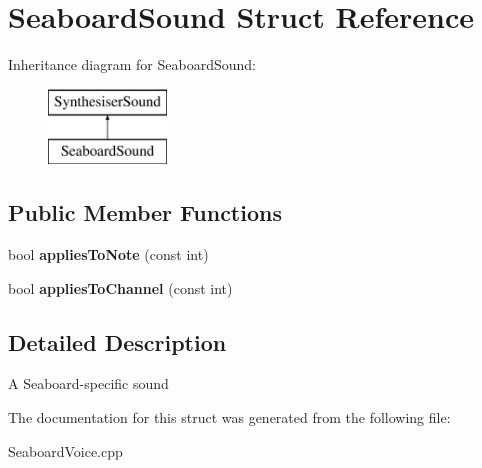 \hypertarget{struct_seaboard_sound}{\section{Seaboard\-Sound Struct Reference}
\label{struct_seaboard_sound}
}
Inheritance diagram for Seaboard\-Sound\-:\begin{figure}[H]
\begin{center}
\leavevmode
\includegraphics[height=2.000000cm]{struct_seaboard_sound}
\end{center}
\end{figure}
\subsection*{Public Member Functions}
\begin{DoxyCompactItemize}
\item 
\hypertarget{struct_seaboard_sound_a7e7aa5dc8fce23184d9dce3e65ea1a4d}{bool {\bfseries applies\-To\-Note} (const int)}\label{struct_seaboard_sound_a7e7aa5dc8fce23184d9dce3e65ea1a4d}

\item 
\hypertarget{struct_seaboard_sound_a9912e5112e135c891bcea8a7b58dbce4}{bool {\bfseries applies\-To\-Channel} (const int)}\label{struct_seaboard_sound_a9912e5112e135c891bcea8a7b58dbce4}

\end{DoxyCompactItemize}


\subsection{Detailed Description}
A Seaboard-\/specific sound 

The documentation for this struct was generated from the following file\-:\begin{DoxyCompactItemize}
\item 
Seaboard\-Voice.\-cpp\end{DoxyCompactItemize}
